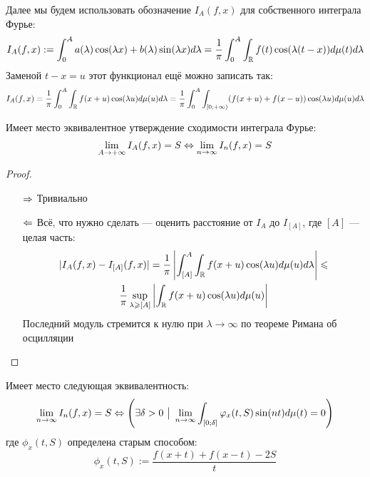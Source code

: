 \begin{note}
	Далее мы будем использовать обозначение $I_A(f, x)$ для собственного интеграла Фурье:
	\[
		I_A(f, x) := \int_0^A a(\lambda)\cos(\lambda x) + b(\lambda)\sin(\lambda x)d\lambda = \frac{1}{\pi} \int_0^A \int_{\mathbb{R}} f(t)\cos(\lambda(t - x))d\mu(t)d\lambda
	\]
	Заменой $t - x = u$ этот функционал ещё можно записать так:
	\[
		I_A(f, x) = \frac{1}{\pi} \int_0^A \int_{\mathbb{R}} f(x + u)\cos(\lambda u)d\mu(u)d\lambda = \frac{1}{\pi} \int_0^A \int_{\left[0; +\infty\right)} (f(x + u) + f(x - u))\cos(\lambda u)d\mu(u)d\lambda
	\]
\end{note}

\begin{lemma}
	Имеет место эквивалентное утверждение сходимости интеграла Фурье:
	\[
		\lim_{A \to +\infty} I_A(f, x) = S \Leftrightarrow \lim_{n \to \infty} I_n(f, x) = S
	\]
\end{lemma}

\begin{proof}~
	\begin{itemize}
		\item[$\Rightarrow$] Тривиально
		
		\item[$\Leftarrow$] Всё, что нужно сделать --- оценить расстояние от $I_A$ до $I_{[A]}$, где $[A]$ --- целая часть:
		\begin{multline*}
			|I_A(f, x) - I_{[A]}(f, x)| = \frac{1}{\pi} \left|\int_{[A]}^A \int_{\mathbb{R}} f(x + u)\cos(\lambda u)d\mu(u)d\lambda\right| \leqslant
			\\
			\frac{1}{\pi} \sup_{\lambda \geqslant [A]} \left|\int_{\mathbb{R}} f(x + u)\cos(\lambda u)d\mu(u)\right|
		\end{multline*}
		Последний модуль стремится к нулю при $\lambda \to \infty$ по теореме Римана об осцилляции
	\end{itemize}
\end{proof}

\begin{lemma}
	Имеет место следующая эквивалентность:
	\[
		\lim_{n \to \infty} I_n(f, x) = S \Leftrightarrow \left(\exists \delta > 0 \ \big|\  \lim_{n \to \infty} \int_{[0; \delta]} \varphi_x(t, S)\sin(nt)d\mu(t) = 0\right)
	\]
	где $\phi_x(t, S)$ определена старым способом:
	\[
		\phi_x(t, S) := \frac{f(x + t) + f(x - t) - 2S}{t}
	\]
\end{lemma}

